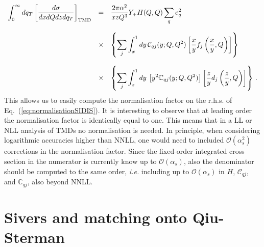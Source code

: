 \documentclass[10pt,a4paper]{article}
\begin{document}
\begin{equation}
\begin{array}{rcl}
\displaystyle \int_{0}^{\infty}dq_T\left[\frac{d\sigma}{dxdQdz d q_T}\right]_{\rm
  TMD}&=&\displaystyle \frac{2\pi \alpha^2}{xzQ^3}Y_+ H(Q,Q) \sum_q e_q^2\\
\\
&\times&\displaystyle\left\{\sum_{j}\int_x^1dy\,\mathcal{C}_{qj}(y;Q,Q^2)\left[\frac{x}{y}f_j\left(\frac{x}{y},Q\right)\right]\right\}\\
\\
&\times&\displaystyle\left\{\sum_{j}\int_z^1dy\,\left[y^2\mathbb{C}_{qj}(y;Q,Q^2)\right]\left[\frac{z}{y}d_j\left(\frac{z}{y},Q\right)\right]\right\}\,.
\end{array}
\end{equation}
This allows us to easily compute the normalisation factor on the
r.h.s. of Eq.~(\ref{eq:normalisationSIDIS}). It is interesting to
observe that at leading order the normalisation factor is identically
equal to one. This means that in a LL or NLL analysis of TMDs no
normalisation is needed. In principle, when considering logarithmic
accuracies higher than NNLL, one would need to included
$\mathcal{O}(\alpha_s^2)$ corrections in the normalisation
factor. Since the fixed-order integrated cross section in the
numerator is currently know up to $\mathcal{O}(\alpha_s)$, also the
denominator should be computed to the same order, \textit{i.e.}
including up to $\mathcal{O}(\alpha_s)$ in $H$, $\mathcal{C}_{qj}$,
and $\mathbb{C}_{qj}$, also beyond NNLL.

\section{Sivers and matching onto Qiu-Sterman}
\end{document}
